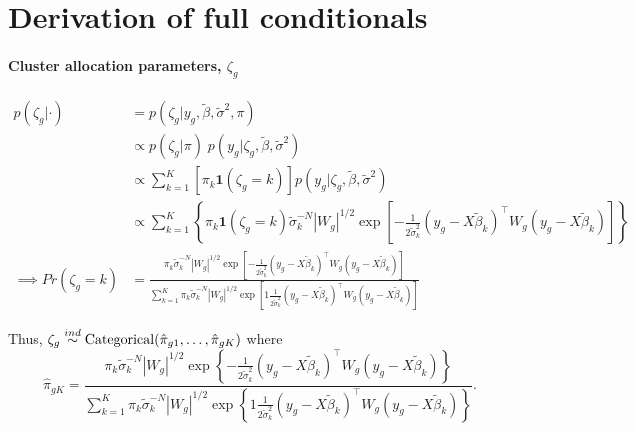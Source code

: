\section{Derivation of full conditionals}
\label{deriv-full-cond}
\small
\paragraph{Cluster allocation parameters, $\zeta_g$}
\begin{align*}
p(\zeta_g|\cdot) & = p(\zeta_g|y_g, \tilde{\beta}, \tilde{\sigma}^2, \pi)\\
& \propto  p(\zeta_g|\pi)\; p(y_g|\zeta_g, \tilde{\beta}, \tilde{\sigma}^2)\\
& \propto  \sum_{k=1}^K \left[ \pi_k \bm{1}(\zeta_g=k)\right] p(y_g|\zeta_g,\tilde{\beta},\tilde{\sigma}^2)\\
& \propto \sum_{k=1}^K \left\{ \pi_k \bm{1}(\zeta_g=k)  \tilde{\sigma}_k^{-N} |W_g|^{1/2} \exp \left[ -\frac{1}{2\tilde{\sigma}^2_k} \left( y_g - X\tilde{\beta}_k \right)^\top W_g \left( y_g - X\tilde{\beta}_k \right) \right]\right\}\\
\implies Pr(\zeta_g=k) & = \frac{\pi_k \tilde{\sigma}_k^{-N} |W_g|^{1/2} \exp \left[ -\frac{1}{2\tilde{\sigma}^2_k} \left( y_g - X\tilde{\beta}_k \right)^\top W_g \left( y_g - X\tilde{\beta}_k \right) \right]}{\sum_{k=1}^K \pi_k \tilde{\sigma}_k^{-N} |W_g|^{1/2} \exp \left[ 1\frac{1}{2\tilde{\sigma}^2_k} \left( y_g - X\tilde{\beta}_k \right)^\top W_g \left( y_g - X\tilde{\beta}_k \right) \right]}
\end{align*}

Thus, $\zeta_g \stackrel{ind}{\sim} \operatorname{Categorical}(\hat{\pi}_{g1},\ldots,\hat{\pi}_{gK})$ where
\begin{equation*}
\hat{\pi}_{gK} = \frac{\pi_k \tilde{\sigma}_k^{-N} |W_g|^{1/2} \exp \left\{ -\frac{1}{2\tilde{\sigma}^2_k} \left( y_g - X\tilde{\beta}_k \right)^\top W_g \left( y_g - X\tilde{\beta}_k \right) \right\}}{\sum_{k=1}^K \pi_k \tilde{\sigma}_k^{-N} |W_g|^{1/2} \exp \left\{ 1\frac{1}{2\tilde{\sigma}^2_k} \left( y_g - X\tilde{\beta}_k \right)^\top W_g \left( y_g - X\tilde{\beta}_k \right) \right\}}.
\end{equation*}

